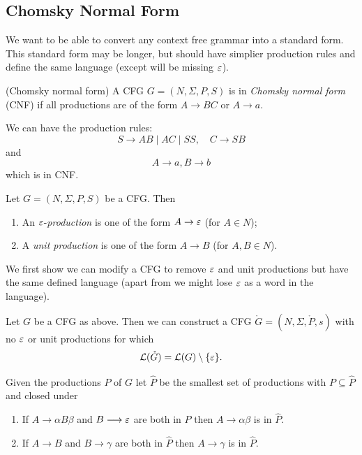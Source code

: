 \documentclass[tikx, border = 10pt]{article}
\begin{document}
\subsection{Chomsky Normal Form}
We want to be able to convert any context free grammar into a standard form. This standard form may be longer, but should have simplier production rules and define the same language (except will be missing $ \varepsilon $).
\begin{definition}
	(Chomsky normal form) A CFG $ G = (N,\Sigma, P,S) $ is in \textit{Chomsky normal form} (CNF) if all productions are of the form $ A \to BC $ or $ A \to a $.
\end{definition}
\begin{example}
  We can have the production rules:
  \[
    S\longrightarrow AB\mid AC\mid SS,\quad C\longrightarrow SB
  \]
  and
  \[
    A\longrightarrow a, B\longrightarrow b
  \]
  which is in CNF.
\end{example}
\begin{definition}
  Let $ G = (N,\Sigma, P,S) $ be a CFG. Then
  \begin{enumerate}
	  \item An $ \varepsilon $-\textit{production} is one of the form $ A\to \varepsilon $ (for $ A\in N $);
	  \item A \textit{unit production} is one of the form $ A\to B $ (for $ A,B\in N $).
  \end{enumerate}
\end{definition}
We first show we can modify a CFG to remove $ \varepsilon $ and unit productions but have the same defined language (apart from we might lose $ \varepsilon $ as a word in the language).
\begin{theorem}
  Let $ G $ be a CFG as above. Then we can construct a CFG $ \mathring G = (N,\Sigma, \mathring P, s) $ with no $ \varepsilon $ or unit productions for which
  \[
	  \mathcal L(\mathring G) = \mathcal L(G)\setminus \{\varepsilon\}.
  \]
\end{theorem}
\pf Given the productions $ P $ of $ G $ let $ \hat P $ be the smallest set of productions with $ P\subseteq \hat P $ and closed under 
\begin{enumerate}
	\item If $ A\longrightarrow \alpha B\beta $ and $ B\longrightarrow \varepsilon $ are both in $ \hat P $ then $ A\longrightarrow \alpha\beta $ is in $ \hat P $.
	\item If $ A\longrightarrow B $ and $ B\longrightarrow \gamma $ are both in $ \hat P $ then $ A\to \gamma $ is in $ \hat P $. 
\end{enumerate}
\end{document}
